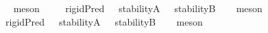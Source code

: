 \begin{isabellebody}
\isadelimproof
\ %
\endisadelimproof
%
\isatagproof
{}\isamarkupfalse%
\ meson%
\endisatagproof
{\isafoldproof}%
%
\isadelimproof
%
\endisadelimproof
\ \ \ \isanewline
{}\isamarkupfalse%
\ {\isachardoublequoteopen}{\isasymlfloor}rigidPred\ {\isacharparenleft}{\isasymtau}{\isacharcolon}{\isacharcolon}{\isasymup}{\isasymlangle}{\isasymup}{\isasymzero}{\isasymrangle}{\isacharparenright}\ \isactrlbold {\isasymleftrightarrow}\ {\isacharparenleft}stabilityA\ {\isasymtau}\ \isactrlbold {\isasymand}\ stabilityB\ {\isasymtau}{\isacharparenright}{\isasymrfloor}{\isachardoublequoteclose}%
\isadelimproof
\ %
\endisadelimproof
%
\isatagproof
{}\isamarkupfalse%
\ meson%
\endisatagproof
{\isafoldproof}%
%
\isadelimproof
%
\endisadelimproof
\ \ \ \isanewline
{}\isamarkupfalse%
\ {\isachardoublequoteopen}{\isasymlfloor}rigidPred\ {\isacharparenleft}{\isasymtau}{\isacharcolon}{\isacharcolon}{\isasymup}{\isasymlangle}{\isasymup}{\isasymlangle}{\isasymzero}{\isasymrangle}{\isasymrangle}{\isacharparenright}\ \isactrlbold {\isasymleftrightarrow}\ {\isacharparenleft}stabilityA\ {\isasymtau}\ \isactrlbold {\isasymand}\ stabilityB\ {\isasymtau}{\isacharparenright}{\isasymrfloor}{\isachardoublequoteclose}%
\isadelimproof
\ %
\endisadelimproof
%
\isatagproof
{}\isamarkupfalse%
\ meson\ \ \ \isanewline
%
\endisatagproof
{\isafoldproof}%
%
\isadelimproof
%
\endisadelimproof
%
\isadelimtheory
%
\endisadelimtheory
%
\isatagtheory
%
\endisatagtheory
{\isafoldtheory}%
%
\isadelimtheory
%
\endisadelimtheory
%
\end{isabellebody}%
